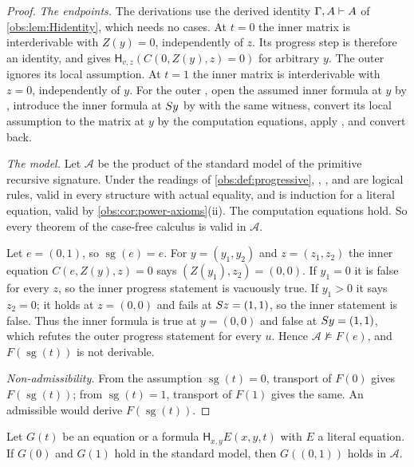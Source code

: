 \begin{proof}
\emph{The endpoints.} The derivations use the derived identity
$\Gamma,A\vdash A$ of \cref{obs:lem:Hidentity}, which needs no cases. At
$t=0$ the inner matrix is interderivable with $Z(y)=0$, independently of $z$.
Its progress step is therefore an identity, and  gives
$\mathsf{H}_{v,z}(C(0,Z(y),z)=0)$ for arbitrary $y$. The outer 
ignores its local assumption. At $t=1$ the inner matrix is interderivable with
$z=0$, independently of $y$. For the outer , open the assumed
inner formula at $y$ by , introduce the inner formula at $S y$
by  with the same witness, convert its local assumption to the
matrix at $y$ by the computation equations, apply , and convert
back.

\emph{The model.} Let $\mathcal{A}$ be the product of the standard model of the
primitive recursive signature. Under the readings of
\cref{obs:def:progressive}, , ,  and
 are logical rules, valid in every structure with actual
equality, and  is induction for a literal equation, valid by
\cref{obs:cor:power-axioms}(ii). The computation equations hold. So every
theorem of the case-free calculus is valid in $\mathcal{A}$.

Let $e=(0,1)$, so $\operatorname{sg}(e)=e$. For $y=(y_1,y_2)$ and
$z=(z_1,z_2)$ the inner equation $C(e,Z(y),z)=0$ says
$(Z(y_1),z_2)=(0,0)$. If $y_1=0$ it is false for every $z$, so the inner
progress statement is vacuously true. If $y_1>0$ it says $z_2=0$; it holds at
$z=(0,0)$ and fails at $S z=(1,1)$, so the inner statement is false. Thus
the inner formula is true at $y=(0,0)$ and false at $S y=(1,1)$, which
refutes the outer progress statement for every $u$. Hence
$\mathcal{A}\not\models F(e)$, and $F(\operatorname{sg}(t))$ is not derivable.

\emph{Non-admissibility.} From the assumption $\operatorname{sg}(t)=0$,
transport of $F(0)$ gives $F(\operatorname{sg}(t))$; from
$\operatorname{sg}(t)=1$, transport of $F(1)$ gives the same. An admissible
 would derive $F(\operatorname{sg}(t))$.
\end{proof}

\begin{proposition}
\label{obs:prop:depth}
Let $G(t)$ be an equation or a formula $\mathsf{H}_{x,y}E(x,y,t)$ with $E$ a
literal equation. If $G(0)$ and $G(1)$ hold in the standard model, then
$G((0,1))$ holds in $\mathcal{A}$.
\end{proposition}

